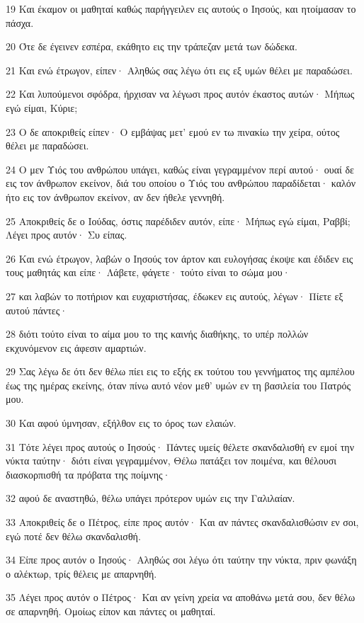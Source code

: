 \par 19 Και έκαμον οι μαθηταί καθώς παρήγγειλεν εις αυτούς ο Ιησούς, και ητοίμασαν το πάσχα.
\par 20 Ότε δε έγεινεν εσπέρα, εκάθητο εις την τράπεζαν μετά των δώδεκα.
\par 21 Και ενώ έτρωγον, είπεν· Αληθώς σας λέγω ότι εις εξ υμών θέλει με παραδώσει.
\par 22 Και λυπούμενοι σφόδρα, ήρχισαν να λέγωσι προς αυτόν έκαστος αυτών· Μήπως εγώ είμαι, Κύριε;
\par 23 Ο δε αποκριθείς είπεν· Ο εμβάψας μετ' εμού εν τω πινακίω την χείρα, ούτος θέλει με παραδώσει.
\par 24 Ο μεν Υιός του ανθρώπου υπάγει, καθώς είναι γεγραμμένον περί αυτού· ουαί δε εις τον άνθρωπον εκείνον, διά του οποίου ο Υιός του ανθρώπου παραδίδεται· καλόν ήτο εις τον άνθρωπον εκείνον, αν δεν ήθελε γεννηθή.
\par 25 Αποκριθείς δε ο Ιούδας, όστις παρέδιδεν αυτόν, είπε· Μήπως εγώ είμαι, Ραββί; Λέγει προς αυτόν· Συ είπας.
\par 26 Και ενώ έτρωγον, λαβών ο Ιησούς τον άρτον και ευλογήσας έκοψε και έδιδεν εις τους μαθητάς και είπε· Λάβετε, φάγετε· τούτο είναι το σώμα μου·
\par 27 και λαβών το ποτήριον και ευχαριστήσας, έδωκεν εις αυτούς, λέγων· Πίετε εξ αυτού πάντες·
\par 28 διότι τούτο είναι το αίμα μου το της καινής διαθήκης, το υπέρ πολλών εκχυνόμενον εις άφεσιν αμαρτιών.
\par 29 Σας λέγω δε ότι δεν θέλω πίει εις το εξής εκ τούτου του γεννήματος της αμπέλου έως της ημέρας εκείνης, όταν πίνω αυτό νέον μεθ' υμών εν τη βασιλεία του Πατρός μου.
\par 30 Και αφού ύμνησαν, εξήλθον εις το όρος των ελαιών.
\par 31 Τότε λέγει προς αυτούς ο Ιησούς· Πάντες υμείς θέλετε σκανδαλισθή εν εμοί την νύκτα ταύτην· διότι είναι γεγραμμένον, Θέλω πατάξει τον ποιμένα, και θέλουσι διασκορπισθή τα πρόβατα της ποίμνης·
\par 32 αφού δε αναστηθώ, θέλω υπάγει πρότερον υμών εις την Γαλιλαίαν.
\par 33 Αποκριθείς δε ο Πέτρος, είπε προς αυτόν· Και αν πάντες σκανδαλισθώσιν εν σοι, εγώ ποτέ δεν θέλω σκανδαλισθή.
\par 34 Είπε προς αυτόν ο Ιησούς· Αληθώς σοι λέγω ότι ταύτην την νύκτα, πριν φωνάξη ο αλέκτωρ, τρίς θέλεις με απαρνηθή.
\par 35 Λέγει προς αυτόν ο Πέτρος· Και αν γείνη χρεία να αποθάνω μετά σου, δεν θέλω σε απαρνηθή. Ομοίως είπον και πάντες οι μαθηταί.
